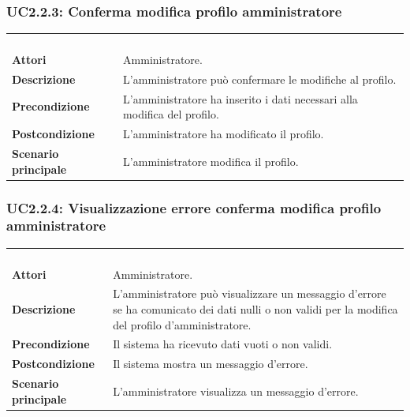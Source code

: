 \subsubsection{UC2.2.3: Conferma modifica profilo amministratore}
\label{UC2.2.3}
\begin{longtable}{l|p{10cm}}
\rowcolor[gray]{0.8} \multicolumn{2}{c}{} \\
\rowcolor[gray]{0.8} \multicolumn{2}{c}{\textbf{UC2.2.3 - Conferma modifica profilo amministratore}} \\
\rowcolor[gray]{0.8} \multicolumn{2}{c}{} \\
\hline
&\\
\textbf{Attori} & Amministratore.\\[7pt]
\textbf{Descrizione} & L'amministratore può confermare le modifiche al profilo.\\[7pt]
\textbf{Precondizione} & L'amministratore ha inserito i dati necessari alla modifica del profilo.\\[7pt]
\textbf{Postcondizione} & L'amministratore ha modificato il profilo.\\[7pt]
\textbf{Scenario principale} &L'amministratore modifica il profilo.\\[7pt]\hline
\end{longtable}

\subsubsection{UC2.2.4: Visualizzazione errore conferma modifica profilo amministratore }
\label{UC2.2.4}
\begin{longtable}{l|p{10cm}}
\rowcolor[gray]{0.8} \multicolumn{2}{c}{} \\
\rowcolor[gray]{0.8} \multicolumn{2}{c}{\textbf{UC2.2.4 - Visualizzazione errore conferma modifica profilo amministratore }} \\
\rowcolor[gray]{0.8} \multicolumn{2}{c}{} \\
\hline
&\\
\textbf{Attori} & Amministratore.\\[7pt]
\textbf{Descrizione} & L'amministratore può visualizzare un messaggio d'errore se ha comunicato dei dati nulli o non validi per la modifica del profilo d'amministratore.\\[7pt]
\textbf{Precondizione} & Il sistema ha ricevuto dati vuoti o non validi.\\[7pt]
\textbf{Postcondizione} & Il sistema mostra un messaggio d'errore.\\[7pt]
\textbf{Scenario principale} &L'amministratore visualizza un messaggio d'errore.\\[7pt]\hline
\end{longtable}

